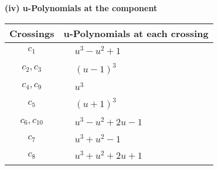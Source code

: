 \documentclass[1p]{elsarticle_modified}
\theoremstyle{definition}
\begin{document}
\newpage\renewcommand{\arraystretch}{1}
\flushleft \textbf{(iv) u-Polynomials at the component}\newline \\
\begin{tabular}{m{50pt}|m{274pt}}
Crossings & \hspace{64pt}u-Polynomials at each crossing \\
\hline $$\begin{aligned}c_{1}\end{aligned}$$&$\begin{aligned}
&u^3- u^2+1
\end{aligned}$\\
\hline $$\begin{aligned}c_{2},c_{3}\end{aligned}$$&$\begin{aligned}
&(u-1)^3
\end{aligned}$\\
\hline $$\begin{aligned}c_{4},c_{9}\end{aligned}$$&$\begin{aligned}
&u^3
\end{aligned}$\\
\hline $$\begin{aligned}c_{5}\end{aligned}$$&$\begin{aligned}
&(u+1)^3
\end{aligned}$\\
\hline $$\begin{aligned}c_{6},c_{10}\end{aligned}$$&$\begin{aligned}
&u^3- u^2+2 u-1
\end{aligned}$\\
\hline $$\begin{aligned}c_{7}\end{aligned}$$&$\begin{aligned}
&u^3+u^2-1
\end{aligned}$\\
\hline $$\begin{aligned}c_{8}\end{aligned}$$&$\begin{aligned}
&u^3+u^2+2 u+1
\end{aligned}$\\
\hline
\end{tabular}\\~\\
\newpage\renewcommand{\arraystretch}{1}
\end{document}
